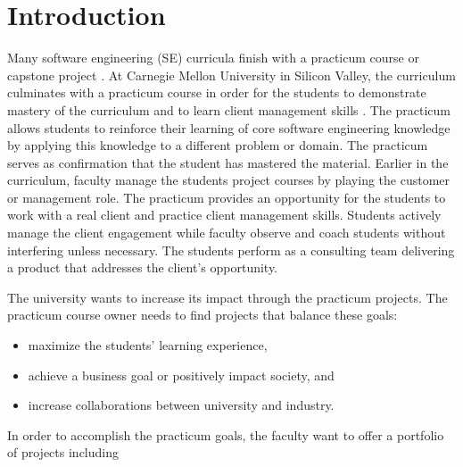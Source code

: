 \documentclass[conference]{IEEEtran}
\begin{document}




%
\IEEEpeerreviewmaketitle


\section{Introduction}
\label{Introduction}

Many software engineering (SE) curricula finish with a practicum course
or capstone project \cite{GSWE}. At Carnegie Mellon
University in Silicon Valley, the curriculum culminates with a practicum
course in order for the students to demonstrate mastery of the
curriculum and to learn client management skills
\cite{Katz}. The practicum allows students to reinforce
their learning of core software engineering knowledge by applying this
knowledge to a different problem or domain. The practicum serves as
confirmation that the student has mastered the material. Earlier in the
curriculum, faculty manage the students project courses by playing the
customer or management role. The practicum provides an opportunity for
the students to work with a real client and practice client management
skills. Students actively manage the client engagement while faculty
observe and coach students without interfering unless necessary. The
students perform as a consulting team delivering a product that addresses the client's opportunity.

The university wants to increase its impact through the practicum
projects. The practicum course owner needs to find projects that
balance these goals:

\begin{itemize}
\itemsep1pt\parskip0pt
\item
  maximize the students' learning experience, 
\item
  achieve a business goal or positively impact society, and
\item
  increase collaborations between university and industry. 
\end{itemize}

In order to accomplish the practicum goals, the faculty want to offer
a portfolio of projects including
\end{document}
